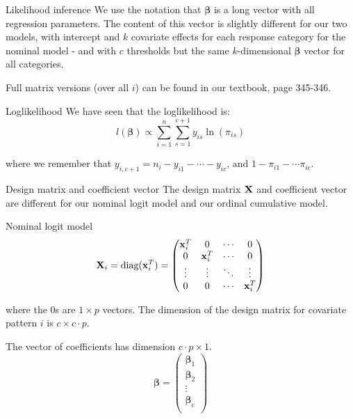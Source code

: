\documentclass[
  ignorenonframetext,
]{beamer}
\begin{document}
\begin{frame}{Likelihood inference}
\label{likelihood-inference}
We use the notation that \({\boldsymbol \beta}\) is a long vector with
all regression parameters. The content of this vector is slightly
different for our two models, with intercept and \(k\) covariate effects
for each response category for the nominal model - and with \(c\)
thresholds but the same \(k\)-dimensional \({\boldsymbol \beta}\) vector
for all categories.

Full matrix versions (over all \(i\)) can be found in our textbook, page
345-346.

\begin{block}{Loglikelihood}
\label{loglikelihood-1}
We have seen that the loglikelihood is:
\[ l({\boldsymbol \beta})\propto\sum_{i=1}^n \sum_{s=1}^{c+1} y_{is}\ln(\pi_{is})\]

where we remember that \(y_{i,c+1}=n_i-y_{i1}-\cdots-y_{ic}\), and
\(1-\pi_{i1}-\cdots \pi_{ic}\).
\end{block}
\end{frame}

\begin{frame}
\begin{block}{Design matrix and coefficient vector}
\label{design-matrix-and-coefficient-vector}
The design matrix \({\bf X}\) and coefficient vector are different for
our nominal logit model and our ordinal cumulative model.

\begin{block}{Nominal logit model}
\label{nominal-logit-model}
\[{\bf X}_i=\text{diag}({\bf x}_i^T)=\begin{pmatrix}{\bf x}_i^T & 0 & \cdots & 0\\
0 & {\bf x}_i^T  & \cdots & 0\\
\vdots & \vdots & \ddots & \vdots\\
0 & 0 & \cdots & {\bf x}_i^T\\
\end{pmatrix}\]

where the \(0\)s are \(1\times p\) vectors. The dimension of the design
matrix for covariate pattern \(i\) is \(c \times c\cdot p\).
\end{block}
\end{block}
\end{frame}

\begin{frame}
The vector of coefficients has dimension \(c\cdot p \times 1\).
\[{\boldsymbol \beta}=\begin{pmatrix}{\boldsymbol \beta}_1\\{\boldsymbol \beta}_2\\\vdots\\{\boldsymbol \beta}_c\\ \end{pmatrix}\]
\end{frame}
\end{document}
